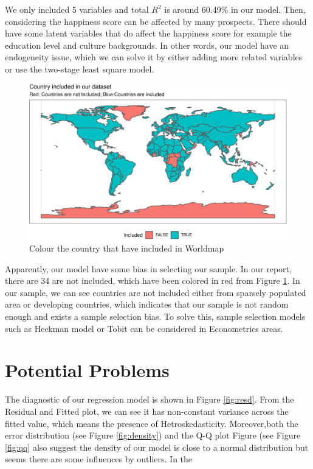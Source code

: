 \documentclass[11pt,a4paper,]{article}
\begin{document}
We only included 5 variables and total \(R^2\) is around 60.49\% in our model. Then, considering the happiness score can be affected by many prospects. There should have some latent variables that do affect the happiness score for example the education level and culture backgrounds. In other words, our model have an endogeneity issue, which we can solve it by either adding more related variables or use the two-stage least square model.

\begin{figure}
\centering
\includegraphics{Assignment4_files/figure-latex/worldmapall-1.pdf}
\caption{\label{fig:worldmapall}Colour the country that have included in Worldmap}
\end{figure}

Apparently, our model have some bias in selecting our sample. In our report, there are 34 are not included, which have been colored in red from Figure \ref{fig:worldmapall}. In our sample, we can see countries are not included either from sparsely populated area or developing countries, which indicates that our sample is not random enough and exists a sample selection bias. To solve this, sample selection models such as Heckman model or Tobit can be considered in Econometrics areas.

\newpage

\hypertarget{potential-problems}{%
\section{Potential Problems}\label{potential-problems}}

The diagnostic of our regression model is shown in Figure \ref{fig:resd}. From the Residual and Fitted plot, we can see it has non-constant variance across the fitted value, which means the presence of Hetroskedasticity. Moreover,both the error distribution (see Figure \ref{fig:density}) and the Q-Q plot Figure (see Figure \ref{fig:qq} also suggest the density of our model is close to a normal distribution but seems there are some influences by outliers. In the
\end{document}
